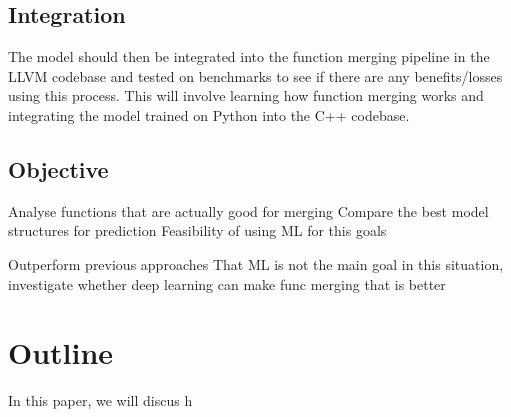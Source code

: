 \subsection{Integration}
The model should then be integrated into the function merging pipeline in the LLVM codebase and tested on benchmarks to see if there are any benefits/losses using this process. This will involve learning how function merging works and integrating the model trained on Python into the C++ codebase.

\subsection{Objective}
Analyse functions that are actually good for merging
Compare the best model structures for prediction
Feasibility of using ML for this goals

Outperform previous approaches
That ML is not the main goal in this situation, investigate whether deep learning can make func merging that is better

\section{Outline}
In this paper, we will discus h